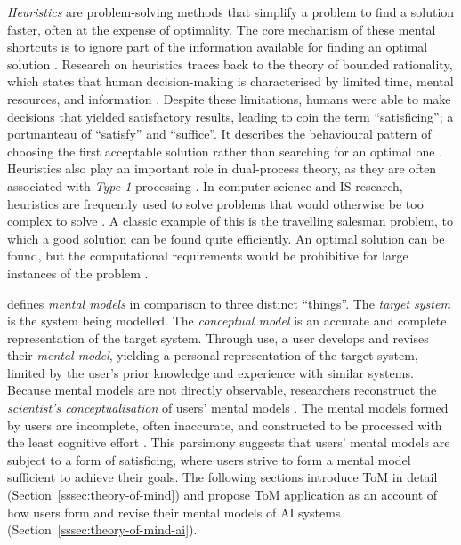 \textit{Heuristics} are problem-solving methods that simplify a problem to find a solution faster, often at the expense of optimality. The core mechanism of these mental shortcuts is to ignore part of the information available for finding an optimal solution \parencite{Gigerenzer2011}. Research on heuristics traces back to the theory of bounded rationality, which states that human decision-making is characterised by limited time, mental resources, and information \parencite{Simon1956}. Despite these limitations, humans were able to make decisions that yielded satisfactory results, leading \textcite{Simon1956} to coin the term \enquote{satisficing}; a portmanteau of \enquote{satisfy} and \enquote{suffice}. It describes the behavioural pattern of choosing the first acceptable solution rather than searching for an optimal one \parencite{Hjeij2023}. Heuristics also play an important role in dual-process theory, as they are often associated with \textit{Type 1} processing \parencite{Kahneman2011}. In computer science and \ac{IS} research, heuristics are frequently used to solve problems that would otherwise be too complex to solve \parencite{Hjeij2023}. A classic example of this is the travelling salesman problem, to which a good solution can be found quite efficiently. An optimal solution can be found, but the computational requirements would be prohibitive for large instances of the problem \parencite{Hjeij2023}.

\textcite{Norman1983} defines \textit{mental models} in comparison to three distinct \enquote{things}. The \textit{target system} is the system being modelled. The \textit{conceptual model} is an accurate and complete representation of the target system. Through use, a user develops and revises their \textit{mental model}, yielding a personal representation of the target system, limited by the user's prior knowledge and experience with similar systems. Because mental models are not directly observable, researchers reconstruct the \textit{scientist's conceptualisation} of users' mental models \parencite{Norman1983}. The mental models formed by users are incomplete, often inaccurate, and constructed to be processed with the least cognitive effort \parencite{Norman1983}. This parsimony suggests that users' mental models are subject to a form of satisficing, where users strive to form a mental model sufficient to achieve their goals. The following sections introduce \ac{ToM} in detail (Section~\ref{sssec:theory-of-mind}) and propose \ac{ToM} application as an account of how users form and revise their mental models of \ac{AI} systems (Section~\ref{sssec:theory-of-mind-ai}).

